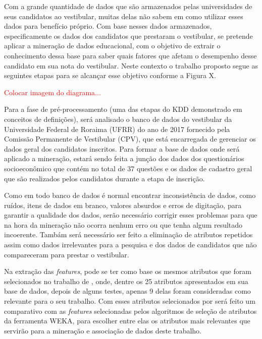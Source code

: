 \label{chapter:metodo}

\par
Com a grande quantidade de dados que são armazenados pelas universidades de seus candidatos ao vestibular, muitas delas não sabem em como utilizar esses dados para benefício próprio. Com base nesses dados armazenados, especificamente os dados dos candidatos que prestaram o vestibular, se pretende aplicar a mineração de dados educacional, com o objetivo de extrair o conhecimento dessa base para saber quais fatores que afetam o desempenho desse candidato em sua nota do vestibular. Neste contexto o trabalho proposto segue as seguintes etapas para se alcançar esse objetivo conforme a Figura X.

\par
\textcolor{red}{Colocar imagem do diagrama...}

\par
Para a fase de pré-processamento (uma das etapas do KDD demonstrado em conceitos de definições), será analisado o banco de dados do vestibular da Universidade Federal de Roraima (UFRR) do ano de 2017 fornecido pela Comissão Permanente de Vestibular (CPV), que está encarregada de gerenciar os dados geral dos candidatos inscritos. Para formar a base de dados onde será aplicado a mineração, estará sendo feita a junção dos dados dos questionários socioeconômico que contém no total de 37 questões e os dados de cadastro geral que são realizados pelos candidatos durante a etapa de inscrição.


\par
Como em todo banco de dados é normal encontrar inconsistência de dados, como ruídos, itens de dados em branco, valores absurdos e erros de digitação, para garantir a qualidade dos dados, serão necessário corrigir esses problemas para que na hora da mineração não ocorra nenhum erro ou que tenha algum resultado incoerente. Tambám será necessário ser feito a eliminação de atributos repetidos assim como dados irrelevantes para a pesquisa e dos dados de candidatos que não compareceram para prestar o vestibular.

\par
Na extração das \textit{features}, pode se ter como base os mesmos atributos que foram selecionados no trabalho de , onde, dentre os 25 atributos apresentados em sua base de dados, depois de alguns testes, apenas 9 delas foram consideradas como relevante para o seu trabalho. Com esses atributos selecionados por  será feito um comparativo com as \textit{features} selecionadas pelos algoritmos de seleção de atributos da ferramenta WEKA, para escolher entre elas os atributos mais relevantes que servirão para a mineração e associação de dados deste trabalho.


